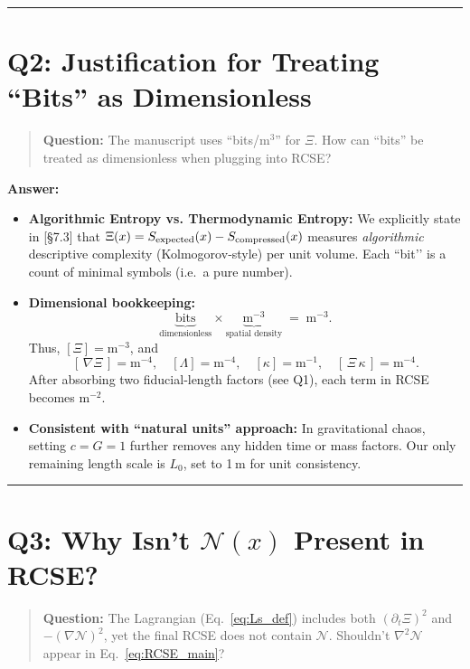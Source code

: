 \documentclass[11pt]{article}
\begin{document}
\vspace{1em}
\hrule

\section*{Q2: Justification for Treating “Bits” as Dimensionless}
\begin{quote}
\textbf{Question:} The manuscript uses “bits/m$^3$” for $\Xi$.  How can “bits” be treated as dimensionless when plugging into RCSE?
\end{quote}

\noindent\textbf{Answer:}  
\begin{itemize}[itemsep=0.5em]
  \item \textbf{Algorithmic Entropy vs. Thermodynamic Entropy:}  
    We explicitly state in [§7.3] that $\Xi(x)=S_{\rm expected}(x)-S_{\rm compressed}(x)$ measures \emph{algorithmic} descriptive complexity (Kolmogorov‐style) per unit volume.  Each “bit’’ is a count of minimal symbols (i.e.\ a pure number).  
  \item \textbf{Dimensional bookkeeping:}  
    \[
      \underbrace{\mathrm{bits}}_{\text{dimensionless}} 
      \times \underbrace{\mathrm{m}^{-3}}_{\text{spatial density}} 
      \;=\;\mathrm{m}^{-3}.
    \]
    Thus, $[\Xi]=\mathrm{m}^{-3}$, and 
    \[
      [\,\nabla \Xi\,] = \mathrm{m}^{-4},\quad
      [\Lambda]=\mathrm{m}^{-4},\quad
      [\kappa]=\mathrm{m}^{-1},\quad
      [\,\Xi\,\kappa\,]=\mathrm{m}^{-4}.
    \]
    After absorbing two fiducial‐length factors (see Q1), each term in RCSE becomes $\mathrm{m}^{-2}$.  
  \item \textbf{Consistent with “natural units” approach:}  
    In gravitational chaos, setting $c=G=1$ further removes any hidden time or mass factors.  Our only remaining length scale is $L_0$, set to 1 m for unit consistency.  
\end{itemize}

\vspace{1em}
\hrule

\section*{Q3: Why Isn’t $\mathcal N(x)$ Present in RCSE?}
\begin{quote}
\textbf{Question:} The Lagrangian (Eq.~\eqref{eq:Ls_def}) includes both $(\partial_t\Xi)^2$ and $-(\nabla\mathcal N)^2$, yet the final RCSE does not contain $\mathcal N$. Shouldn’t $\nabla^2 \mathcal N$ appear in Eq.~\eqref{eq:RCSE_main}?
\end{quote}
\end{document}

